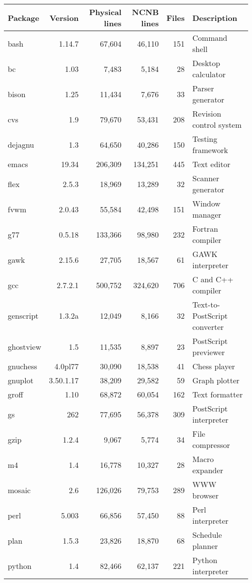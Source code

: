\begin{tabular}{|l|r|r|r|r|l|}\hline
Package & Version & Physical lines & NCNB lines & Files & Description\\\hline\hline
bash & 1.14.7 & 67,604 & 46,110 & 151 & Command shell \\\hline
bc & 1.03 & 7,483 & 5,184 & 28 & Desktop calculator \\\hline
bison & 1.25 & 11,434 & 7,676 & 33 & Parser generator \\\hline
cvs & 1.9 & 79,670 & 53,431 & 208 & Revision control system \\\hline
dejagnu & 1.3 & 64,650 & 40,286 & 150 & Testing framework \\\hline
emacs & 19.34 & 206,309 & 134,251 & 445 & Text editor\\\hline
flex & 2.5.3 & 18,969 & 13,289 & 32 & Scanner generator \\\hline
fvwm & 2.0.43 & 55,584 & 42,498 & 151 & Window manager \\\hline
g77 & 0.5.18 & 133,366 & 98,980 & 232 & Fortran compiler \\\hline
gawk & 2.15.6 & 27,705 & 18,567 & 61 & GAWK interpreter \\\hline
gcc & 2.7.2.1 & 500,752 & 324,620 & 706 & C and C++ compiler\\\hline
genscript & 1.3.2a & 12,049 & 8,166 & 32 & Text-to-PostScript converter \\\hline
ghostview & 1.5 & 11,535 & 8,897 & 23 & PostScript previewer \\\hline
gnuchess & 4.0pl77 & 30,090 & 18,538 & 41 & Chess player \\\hline
gnuplot & 3.50.1.17 & 38,209 & 29,582 & 59 & Graph plotter \\\hline
groff & 1.10 & 68,872 & 60,054 & 162 & Text formatter \\\hline
gs & 262 & 77,695 & 56,378 & 309 & PostScript interpreter \\\hline
gzip & 1.2.4 & 9,067 & 5,774 & 34 & File compressor \\\hline
m4 & 1.4 & 16,778 & 10,327 & 28 & Macro expander \\\hline
mosaic & 2.6 & 126,026 & 79,753 & 289 & WWW browser\\\hline
perl & 5.003 & 66,856 & 57,450 & 88 & Perl interpreter \\\hline
plan & 1.5.3 & 23,826 & 18,870 & 68 & Schedule planner \\\hline
python & 1.4 & 82,466 & 62,137 & 221 & Python interpreter \\\hline

\end{tabular}
